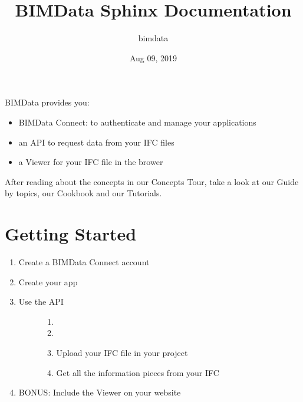 \documentclass[a4paper,12pt,english]{sphinxmanual}
\title{BIMData Sphinx Documentation}
\date{Aug 09, 2019}
\author{bimdata}
\begin{document}
\pagestyle{empty}

\pagestyle{plain}

\pagestyle{normal}
\label{\detokenize{index::doc}}


BIMData provides you:
\begin{itemize}
\item {} 
BIMData Connect: to authenticate and manage your applications

\item {} 
an API to request data from your IFC files

\item {} 
a Viewer for your IFC file in the brower

\end{itemize}

After reading about the concepts in our Concepts Tour, take a look at our Guide by topics, our Cookbook and our Tutorials.


\chapter{Getting Started}
\label{\detokenize{tutorials/getting_started:getting-started}}\label{\detokenize{tutorials/getting_started::doc}}\begin{enumerate}
\def\theenumi{\arabic{enumi}}
\def\labelenumi{\theenumi .}
\makeatletter\def\p@enumii{\p@enumi \theenumi .}\makeatother
\item {} 
Create a BIMData Connect account

\item {} 
Create your app

\item {} \begin{description}
\item[{Use the API}] \leavevmode\begin{enumerate}
\def\theenumii{\arabic{enumii}}
\def\labelenumii{\theenumii .}
\makeatletter\def\p@enumiii{\p@enumii \theenumii .}\makeatother
\item {} 

\item {} 

\item {} 
Upload your IFC file in your project

\item {} 
Get all the information pieces from your IFC

\end{enumerate}

\end{description}

\item {} 
BONUS: Include the Viewer on your website

\end{enumerate}
\end{document}
